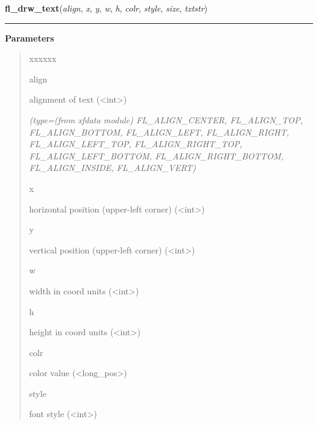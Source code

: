 \hspace{.8\funcindent}\begin{boxedminipage}{\funcwidth}

    \raggedright \textbf{fl\_drw\_text}(\textit{align}, \textit{x}, \textit{y}, \textit{w}, \textit{h}, \textit{colr}, \textit{style}, \textit{size}, \textit{txtstr})

    \vspace{-1.5ex}

    \rule{\textwidth}{0.5\fboxrule}
\setlength{\parskip}{2ex}
\setlength{\parskip}{1ex}
      \textbf{Parameters}
      \vspace{-1ex}

      \begin{quote}
        \begin{Ventry}{xxxxxx}

          \item[align]

          alignment of text ({\textless}int{\textgreater})

            {\it (type=(from xfdata module) FL\_ALIGN\_CENTER, FL\_ALIGN\_TOP, FL\_ALIGN\_BOTTOM, 
FL\_ALIGN\_LEFT, FL\_ALIGN\_RIGHT, FL\_ALIGN\_LEFT\_TOP, 
FL\_ALIGN\_RIGHT\_TOP, FL\_ALIGN\_LEFT\_BOTTOM, FL\_ALIGN\_RIGHT\_BOTTOM, 
FL\_ALIGN\_INSIDE, FL\_ALIGN\_VERT)}

          \item[x]

          horizontal position (upper-left corner) 
          ({\textless}int{\textgreater})

          \item[y]

          vertical position (upper-left corner) 
          ({\textless}int{\textgreater})

          \item[w]

          width in coord units ({\textless}int{\textgreater})

          \item[h]

          height in coord units ({\textless}int{\textgreater})

          \item[colr]

          color value ({\textless}long\_pos{\textgreater})

          \item[style]

          font style ({\textless}int{\textgreater})


\end{Ventry}
\end{quote}
\end{boxedminipage}
